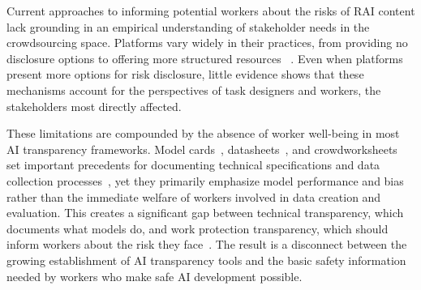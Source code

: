 
Current approaches to informing potential workers about the risks of RAI content lack grounding in an empirical understanding of stakeholder needs in the crowdsourcing space. Platforms vary widely in their practices, from providing no disclosure options to offering more structured resources ~\cite{prolific2025participant, prolific2025sensitive, ProlificAPIContentWarning2025}. Even when platforms present more options for risk disclosure, little evidence shows that these mechanisms account for the perspectives of task designers and workers, the stakeholders most directly affected. 

These limitations are compounded by the absence of worker well-being in most AI transparency frameworks. Model cards~\cite{mitchell2019model}, datasheets~\cite{gebru2021datasheets}, and crowdworksheets~\cite{diaz2022crowdworksheets} set important precedents for documenting technical specifications and data collection processes~\cite{gebru2021datasheets, diaz2022crowdworksheets, mitchell2019model}, yet they primarily emphasize model performance and bias rather than the immediate welfare of workers involved in data creation and evaluation. This creates a significant gap between technical transparency, which documents what models do, and work protection transparency, which should inform workers about the risk they face~\cite{bharucha2023content}. The result is a disconnect between the growing establishment of AI transparency tools and the basic safety information needed by workers who make safe AI development possible. 

